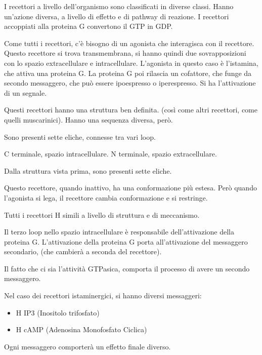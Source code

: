 
I recettori a livello dell'organismo sono classificati in diverse
classi.
Hanno un'azione diversa, a livello di effetto e di pathway di reazione.
I recettori accoppiati alla proteina G convertono il GTP in GDP.


Come tutti i recettori, c'è bisogno di un agonista che interagisca con
il recettore. Questo recettore si trova transmembrana, si hanno quindi
due sovrapposizioni con lo spazio extracellulare e intracellulare.
L'agonista in questo caso è l'istamina, che attiva una proteina G.
La proteina G poi rilascia un cofattore, che funge da secondo
messaggero, che può essere ipoespresso o iperespresso.
Si ha l'attivazione di un segnale.

Questi recettori hanno una struttura ben definita. (così come altri
recettori, come quelli muscarinici). Hanno una sequenza diversa, però.

Sono presenti sette eliche, connesse tra vari loop.

C terminale, spazio intracellulare. N terminale, spazio extracellulare.

Dalla struttura vista prima, sono presenti sette eliche.

Questo recettore, quando inattivo, ha una conformazione più estesa. Però
quando l'agonista si lega, il recettore cambia conformazione e si
restringe.

Tutti i recettori H simili a livello di struttura e di meccanismo.

Il terzo loop nello spazio intracellulare è responsabile
dell'attivazione della proteina G. L'attivazione della proteina G porta
all'attivazione del messaggero secondario, (che cambierà a seconda del
recettore).

Il fatto che ci sia l'attività GTPasica, comporta il processo di avere
un secondo messaggero.

Nel caso dei recettori istaminergici, si hanno diversi messaggeri:
\begin{itemize}
    \item H IP3 (Inositolo trifosfato) 
    \item H cAMP (Adenosina Monofosfato Ciclica)
\end{itemize}

Ogni messaggero comporterà un effetto finale diverso.

